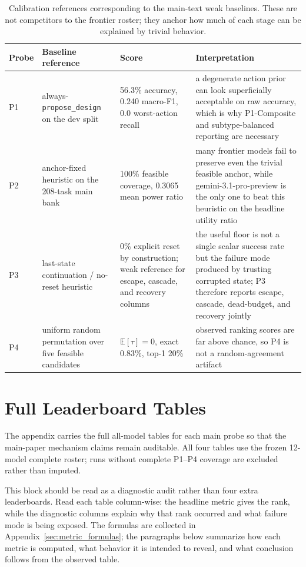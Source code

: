 \begin{table}[t]
\caption{Calibration references corresponding to the main-text weak baselines. These are not competitors to the frontier roster; they anchor how much of each stage can be explained by trivial behavior.}
\label{tab:appendix_calibration}
\centering
\small
\begin{tabular}{lp{30mm}p{23mm}p{60mm}}
\toprule
Probe & Baseline reference & Score & Interpretation \\
\midrule
P1 & always-\texttt{propose\_design} on the dev split & 56.3\% accuracy, 0.240 macro-F1, 0.0 worst-action recall & a degenerate action prior can look superficially acceptable on raw accuracy, which is why P1-Composite and subtype-balanced reporting are necessary \\
P2 & anchor-fixed heuristic on the 208-task main bank & 100\% feasible coverage, 0.3065 mean power ratio & many frontier models fail to preserve even the trivial feasible anchor, while gemini-3.1-pro-preview is the only one to beat this heuristic on the headline utility ratio \\
P3 & last-state continuation / no-reset heuristic & 0\% explicit reset by construction; weak reference for escape, cascade, and recovery columns & the useful floor is not a single scalar success rate but the failure mode produced by trusting corrupted state; P3 therefore reports escape, cascade, dead-budget, and recovery jointly \\
P4 & uniform random permutation over five feasible candidates & $\mathbb{E}[\tau]=0$, exact 0.83\%, top-1 20\% & observed ranking scores are far above chance, so P4 is not a random-agreement artifact \\
\bottomrule
\end{tabular}
\end{table}

\clearpage
\section{Full Leaderboard Tables}

The appendix carries the full all-model tables for each main probe so that the main-paper mechanism claims remain auditable. All four tables use the frozen 12-model complete roster; runs without complete P1--P4 coverage are excluded rather than imputed.

This block should be read as a diagnostic audit rather than four extra leaderboards. Read each table column-wise: the headline metric gives the rank, while the diagnostic columns explain why that rank occurred and what failure mode is being exposed. The formulas are collected in Appendix~\ref{sec:metric_formulas}; the paragraphs below summarize how each metric is computed, what behavior it is intended to reveal, and what conclusion follows from the observed table.

